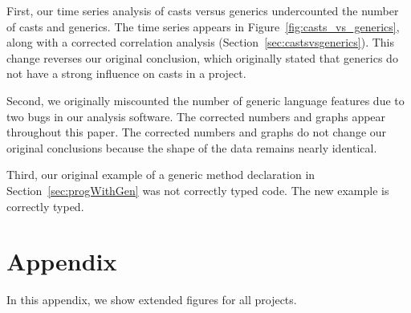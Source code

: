 \documentclass{svjour3}
\begin{document}
First, our time series analysis of casts versus generics
undercounted the number of casts and generics.
The time series appears in Figure~\ref{fig:casts_vs_generics}, 
along with a corrected correlation analysis (Section~\ref{sec:castsvsgenerics}).
This change reverses our original conclusion, which originally stated 
that generics do not have a strong influence on casts in a project.

Second, we originally miscounted the number of generic language features
due to two bugs in our analysis software.
The corrected numbers and graphs appear throughout this paper.
The corrected numbers and graphs do not change our original conclusions
because the shape of the data remains nearly identical.

Third, our original example of a generic method declaration in Section~\ref{sec:progWithGen}
was not correctly typed code.
The new example is correctly typed.




\newpage

\section*{Appendix}

In this appendix, we show extended figures for all projects.
\end{document}
